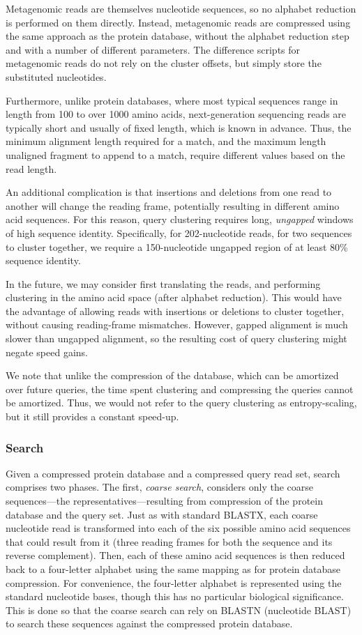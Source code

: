 \documentclass[review,preprint,12pt]{elsarticle}
\theoremstyle{definition}
\theoremstyle{remark}
\begin{document}
Metagenomic reads are themselves nucleotide sequences, so no alphabet reduction
is performed on them directly.
Instead, metagenomic reads are compressed using the same approach as the
protein database, without the alphabet reduction step and with a number of
different parameters.
The difference scripts for metagenomic reads do not rely on the cluster offsets,
but simply store the substituted nucleotides.

Furthermore, unlike protein databases, where most typical sequences range in 
length from 100 to over 1000 amino acids, next-generation sequencing reads are 
typically short and usually of fixed length, which is known in advance.
Thus, the minimum alignment length required for a match, and the maximum
length unaligned fragment to append to a match, require different values based
on the read length.

An additional complication is that insertions and deletions from one read to
another will change the reading frame, potentially resulting in 
different amino acid sequences.
For this reason, query clustering requires long, \emph{ungapped} windows of high
sequence identity.
Specifically, for 202-nucleotide reads, for two sequences to cluster together,
we require a 150-nucleotide ungapped region of at least 80\% sequence identity.

In the future, we may consider first translating the reads, and performing
clustering in the amino acid space (after alphabet reduction).
This would have the advantage of allowing reads with insertions or deletions
to cluster together, without causing reading-frame mismatches.
However, gapped alignment is much slower than ungapped alignment,
so the resulting cost of query clustering might negate speed gains.

We note that unlike the compression of the database, which can be amortized 
over future queries, the time spent clustering and compressing the queries 
cannot be amortized.
Thus, we would not refer to the query clustering as entropy-scaling, but it
still provides a constant speed-up.


\subsubsection{Search}

Given a compressed protein database and a compressed query read set, search
comprises two phases.
The first, \emph{coarse search}, considers only the coarse sequences---the
representatives---resulting from compression of the protein database and the
query set.
Just as with standard BLASTX, each coarse nucleotide read is transformed into 
each of the six possible amino acid sequences that could result from it (three 
reading frames for both the sequence and its reverse complement).
Then, each of these amino acid sequences is then reduced back to a four-letter
alphabet using the same mapping as for protein database compression.
For convenience, the four-letter alphabet is represented using the standard
nucleotide bases, though this has no particular biological significance.
This is done so that the coarse search can rely on BLASTN (nucleotide BLAST) to
search these sequences against the compressed protein database.
\end{document}
